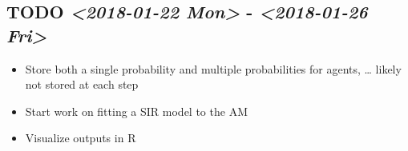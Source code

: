 \documentclass{article}
\begin{document}
\subsection{{\bfseries\sffamily TODO} \textit{<2018-01-22 Mon>} - \textit{<2018-01-26 Fri>}}
\label{sec-6-3}
\begin{itemize}
\item Store both a single probability and multiple probabilities for agents, \ldots{} likely not stored at each step
\item Start work on fitting a SIR model to the AM
\item Visualize outputs in R
\end{itemize}
\end{document}
